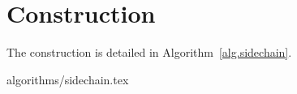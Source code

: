 \section{Construction}

The construction is detailed in Algorithm~\ref{alg.sidechain}.

{algorithms/sidechain.tex}


